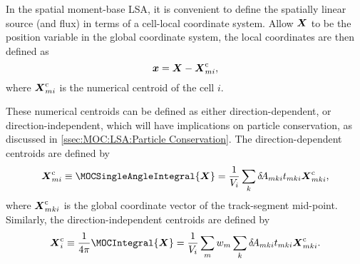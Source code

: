 {{{            In the spatial moment-base \ac{LSA}, it is convenient to define the spatially linear source (and flux) in terms of a cell-local coordinate system.
            Allow $\boldsymbol{X}$ to be the position variable in the global coordinate system, the local coordinates are then defined as
            \begin{equation}\label{eq:MOC:LSA:Global to Local Coordinates}
                \loc = \Loc - \centroid[\Loc][mi],
            \end{equation}
            where $\centroid[\Loc][mi]$ is the numerical centroid of the cell $i$.

            These numerical centroids can be defined as either direction-dependent, or direction-independent, which will have implications on particle conservation, as discussed in \cref{ssec:MOC:LSA:Particle Conservation}.
            The direction-dependent centroids are defined by
            \begin{equation}\label{eq:MOC:LSA:Direction-Dependent Centroids}
                \centroid[\Loc][mi] \defined \MOCSingleAngleIntegral{\Loc} = \frac{1}{V_i}\suml[k]\tA[mki]\nsegl\locCent[\Loc],
            \end{equation}
            where $\locCent[\Loc]$ is the global coordinate vector of the track-segment mid-point.
            Similarly, the direction-independent centroids are defined by
            \begin{equation}\label{eq:MOC:LSA:Direction-Independent Centroids}
                \centroid[\Loc][i] \defined \rfourpi\MOCIntegral{\Loc} = \frac{1}{V_i}\suml[m]\wt\suml[k]\tA[mki]\nsegl\locCent[\Loc].
            \end{equation}

}}}
